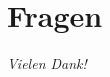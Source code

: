 \section{Fragen}\label{sec:fragen}
\begin{frame}
    \centering \Large
    \emph{Vielen Dank!}
\end{frame}